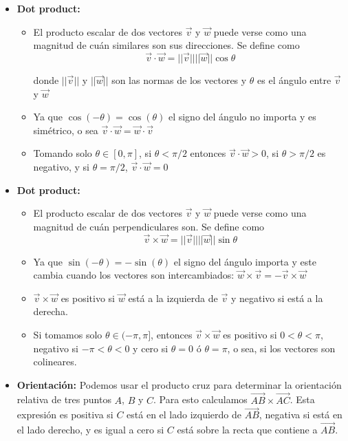 \begin{itemize}
    \item{
		\textbf{Dot product:} 
			\begin{itemize}
				\item{ El producto escalar de dos vectores $\overrightarrow{v}$ y $\overrightarrow{w}$
					puede verse como una magnitud de cu\'an similares son sus direcciones. Se define como
					$$ \overrightarrow{v} \cdot \overrightarrow{w} = 
					|| \overrightarrow{v}|| || \overrightarrow{	w}|| \cos \theta $$
		
                    donde $|| \overrightarrow{v}||$ y $ || \overrightarrow{w}|| $
					son las normas de los vectores y $\theta$ es el \'angulo entre $\overrightarrow{v}$ y 
					$\overrightarrow{w}$
				}
				\item{
					Ya que $\cos(-\theta) = \cos(\theta)$ el signo del \'angulo no importa y es sim\'etrico, 
					o sea $ \overrightarrow{v} \cdot \overrightarrow{w} = \overrightarrow{w} \cdot \overrightarrow{v}$
				}
				\item{
					Tomando solo $\theta \in [0, \pi] $, si $\theta < \pi / 2$ entonces $ \overrightarrow{v} \cdot \overrightarrow{w} > 0$,
					si $\theta > \pi / 2$ es negativo, y si $\theta = \pi / 2$, $ \overrightarrow{v} \cdot \overrightarrow{w} = 0$
				}
		\end{itemize}
    }
    \item{
		\textbf{Dot product:} 
			\begin{itemize}
				\item{
					El producto escalar de dos vectores $\overrightarrow{v}$ y $\overrightarrow{w}$
					puede verse como una magnitud de cu\'an perpendiculares son. Se define como
					$$ \overrightarrow{v} \times \overrightarrow{w} = 
					|| \overrightarrow{v}|| || \overrightarrow{	w}|| \sin \theta $$
				}
				\item{
					Ya que $\sin(-\theta) = -\sin(\theta)$ el signo del \'angulo importa y este  
					cambia cuando los vectores son intercambiados: $ \overrightarrow{w} \times \overrightarrow{v}
					= - \overrightarrow{v} \times \overrightarrow{w} $
				}
				\item{
					$\overrightarrow{v} \times \overrightarrow{w}$ es positivo si $\overrightarrow{w}$ est\'a 
					a la izquierda de $\overrightarrow{v}$ y negativo si est\'a a la derecha. 
				}
				\item{
					Si tomamos solo $\theta \in (-\pi, \pi]$, entonces $\overrightarrow{v} \times \overrightarrow{w}$
					es positivo si $ 0 < \theta < \pi $, negativo si $ -\pi < \theta < 0 $ y cero si $\theta = 0$ \'o 
					$\theta = \pi$, o sea, si los vectores son colineares.  
			    }
			\end{itemize}
    }
    \item{
		\textbf{Orientaci\'on:}
		Podemos usar el producto cruz para determinar la orientaci\'on relativa de tres puntos $A$, $B$ y $C$. Para 
		esto calculamos $ \overrightarrow{AB} \times \overrightarrow{AC} $. Esta expresi\'on es positiva si $C$ est\'a 
		en el lado izquierdo de $\overrightarrow{AB}$, negativa si est\'a en el lado derecho, y es igual a cero si
		$C$ est\'a sobre la recta que contiene a $\overrightarrow{AB}$.  
		
}
\end{itemize}
